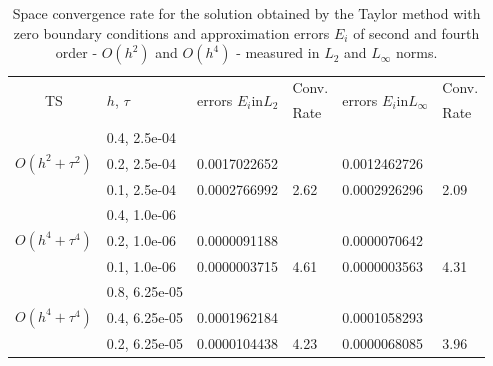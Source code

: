 \documentclass[%
 aip,
cp,  
 amsmath,amssymb,
 reprint,
]{iopconfser}
\begin{document}
\begin{table}[ht]
\centering
\small
		\begin{tabular}{||c|l|ll|ll||}
			\hline
			\hline
      \multirow{2  }{*}{TS}        & \multirow{2  }{*}{$h$, $\tau$}  & \multirow{2  }{*}{errors $E_i$in$L_2$}  &Conv.& \multirow{2  }{*}{errors $E_i$in$L_\infty$}  &Conv.  \\
	         &                    &                               & Rate   &                                        & Rate \\
   			\hline 
					\hline 
                                    &0.4, 2.5e-04          &              &              &                     &      \\
      $O(h^2 + \tau^ 2)$ &0.2, 2.5e-04          &0.0017022652 &            &0.0012462726    &       \\
                                   &0.1, 2.5e-04   & 0.0002766992 & 2.62    &0.0002926296    &  2.09      \\
			\hline 
                                  &0.4, 1.0e-06        &             &            &           &   \\
   $O(h^4+ \tau^4)$   &0.2, 1.0e-06       &  0.0000091188  &            &0.0000070642 &   \\
                                  &0.1, 1.0e-06  &0.0000003715   &4.61  &0.0000003563  & 4.31 \\
			\hline
                                 &0.8, 6.25e-05    &            &               &             &    \\
 $O(h^4+ \tau^4)$    &0.4, 6.25e-05     & 0.0001962184   &        &  0.0001058293   &   \\
                                &0.2, 6.25e-05   &0.0000104438 & 4.23  & 0.0000068085  & 3.96  \\
    \hline
			\hline 
		\end{tabular}
		\caption{Space convergence rate for the solution obtained by the Taylor method with zero boundary conditions and approximation errors $E_i$ of second and fourth order - $O(h^{2})$ and $O(h^{4})$ - measured in $L_2$ and $L_\infty$ norms.}
\label{tableA}
\end{table}

\end{document}
